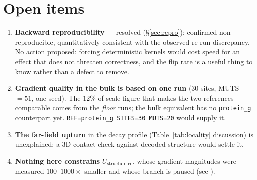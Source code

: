 \documentclass[11pt,a4paper]{article}
\begin{document}
\section{Open items}

\begin{enumerate}\itemsep3pt
  \item \textbf{Backward reproducibility} --- resolved (\S\ref{sec:repro}):
        confirmed non-reproducible, quantitatively consistent with the
        observed re-run discrepancy. No action proposed: forcing deterministic
        kernels would cost speed for an effect that does not threaten
        correctness, and the flip rate is a useful thing to know rather than
        a defect to remove.
  \item \textbf{Gradient quality in the bulk is based on one run}
        (30 sites, MUTS$=51$, one seed). The $12\%$-of-scale figure that makes
        the two references comparable comes from the \emph{floor} runs; the
        bulk equivalent has no \texttt{protein\_g} counterpart yet.
        \texttt{REF=protein\_g SITES=30 MUTS=20} would supply it.
  \item \textbf{The far-field upturn} in the decay profile
        (Table~\ref{tab:locality} discussion) is unexplained; a 3D-contact
        check against decoded structure would settle it.
  \item \textbf{Nothing here constrains} $U_{\mathrm{structure\_ce}}$, whose
        gradient magnitudes were measured $100$--$1000\times$ smaller and
        whose branch is paused (see ).
\end{enumerate}
\end{document}
